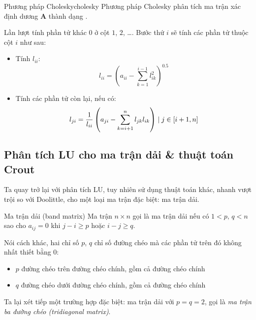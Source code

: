 \documentclass[../../Lectures]{subfiles}
\begin{document}
\begin{cmethod}{Phương pháp Cholesky}{cholesky}
    Phương pháp Cholesky phân tích ma trận xác định dương \(\bm{A}\) thành dạng
    \LLt.

    Lần lượt tính phần tử khác \(0\) ở cột \(1\), \(2\), \ldots. Bước thứ \(i\)
    sẽ tính các phần tử thuộc cột \(i\) như sau:
    \begin{itemize}
        \item Tính \(l_{ii}\):
            \[l_{ii} = \left(a_{ii} - \sum_{k = 1}^{i - 1} l_{ik}^2\right)^{\num{0.5}}\]

        \item Tính các phần tử còn lại, nếu có:
            \[l_{ji} = \frac{1}{l_{ii}} \left(a_{ji} - \sum_{k = i + 1}^{n} l_{jk} l_{ik}\right) \mid j \in \interval{i + 1}{n}\]
    \end{itemize}
\end{cmethod}

\subsection{Phân tích LU cho ma trận dải \& thuật toán Crout}

Ta quay trở lại với phân tích LU, tuy nhiên sử dụng thuật toán khác, nhanh vượt
trội so với Doolittle, cho một loại ma trận đặc biệt: ma trận dải.

\begin{cdefinition}{Ma trận dải (band matrix)}{}
    Ma trận \(n \times n\) gọi là ma trận dải nếu có \(1 < p \text{, } q < n\)
    sao cho \(a_{ij} = 0\) khi \(j - i \geq p\) hoặc \(i - j \geq q\).
\end{cdefinition}

Nói cách khác, hai chỉ số \(p\), \(q\) chỉ số đường chéo mà các phần tử trên đó
không nhất thiết bằng \(0\):
\begin{itemize}
    \item \(p\) đường chéo trên đường chéo chính, gồm cả đường chéo chính
    \item \(q\) đường chéo dưới đường chéo chính, gồm cả đường chéo chính
\end{itemize}

Ta lại xét tiếp một trường hợp đặc biệt: ma trận dải với \(p = q = 2\), gọi là
\emph{ma trận ba đường chéo (tridiagonal matrix)}.
\end{document}
